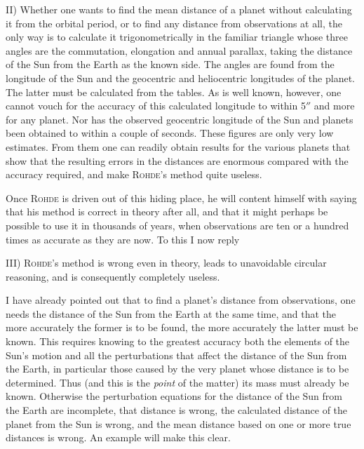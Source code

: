 \noindent II) Whether one wants to find the mean distance of a planet without calculating it from the orbital period, or to find any distance from observations at all, the only way is to calculate it trigonometrically in the familiar triangle whose three angles are the commutation, elongation and annual parallax, taking the distance of the Sun from the Earth as the known side. The angles are found from the longitude of the Sun and the geocentric and heliocentric longitudes of the planet. The latter must be calculated from the tables. As is well known, however, one cannot vouch for the accuracy of this calculated longitude to within 5$''$ and more for any planet. Nor has the observed geocentric longitude of the Sun and planets been obtained to within a couple of seconds. These figures are only very low estimates. From them one can readily obtain results for the various planets that show that the resulting errors in the distances are enormous compared with the accuracy required, and make \textsc{Rohde}’s method quite useless.

Once \textsc{Rohde} is driven out of this hiding place, he will content himself with saying that his method is correct in theory after all, and that it might perhaps be possible to use it in thousands of years, when observations are ten or a hundred times as accurate as they are now. To this I now reply

III) \textsc{Rohde}’s method is wrong even in theory, leads to unavoidable circular reasoning, and is consequently completely useless.

I have already pointed out that to find a planet’s distance from observations, one needs the distance of the Sun from the Earth at the same time, and that the more accurately the former is to be found, the more accurately the latter must be known. This requires knowing to the greatest accuracy both the elements of the Sun’s motion and all the perturbations that affect the distance of the Sun from the Earth, in particular those caused by the very planet whose distance is to be determined. Thus (and this is the \emph{point} of the matter) its mass must already be known. Otherwise the perturbation equations for the distance of the Sun from the Earth are incomplete, that distance is wrong, the calculated distance of the planet from the Sun is wrong, and the mean distance based on one or more true distances is wrong. An example will make this clear.

